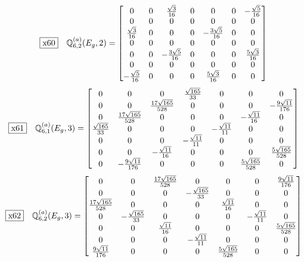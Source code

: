 \documentclass[fleqn,10pt,landscape]{jsarticle}
\begin{document}
\begin{dmath*}
\fbox{x60}\quad \mathbb{Q}_{6,2}^{(a)}(E_{g},2)=\begin{bmatrix} 0 & 0 & \frac{\sqrt{3}}{16} & 0 & 0 & 0 & - \frac{\sqrt{5}}{16} \\ 0 & 0 & 0 & 0 & 0 & 0 & 0 \\ \frac{\sqrt{3}}{16} & 0 & 0 & 0 & - \frac{3 \sqrt{5}}{16} & 0 & 0 \\ 0 & 0 & 0 & 0 & 0 & 0 & 0 \\ 0 & 0 & - \frac{3 \sqrt{5}}{16} & 0 & 0 & 0 & \frac{5 \sqrt{3}}{16} \\ 0 & 0 & 0 & 0 & 0 & 0 & 0 \\ - \frac{\sqrt{5}}{16} & 0 & 0 & 0 & \frac{5 \sqrt{3}}{16} & 0 & 0 \end{bmatrix}
\end{dmath*}
\begin{dmath*}
\fbox{x61}\quad \mathbb{Q}_{6,1}^{(a)}(E_{g},3)=\begin{bmatrix} 0 & 0 & 0 & \frac{\sqrt{165}}{33} & 0 & 0 & 0 \\ 0 & 0 & \frac{17 \sqrt{165}}{528} & 0 & 0 & 0 & - \frac{9 \sqrt{11}}{176} \\ 0 & \frac{17 \sqrt{165}}{528} & 0 & 0 & 0 & - \frac{\sqrt{11}}{16} & 0 \\ \frac{\sqrt{165}}{33} & 0 & 0 & 0 & - \frac{\sqrt{11}}{11} & 0 & 0 \\ 0 & 0 & 0 & - \frac{\sqrt{11}}{11} & 0 & 0 & 0 \\ 0 & 0 & - \frac{\sqrt{11}}{16} & 0 & 0 & 0 & \frac{5 \sqrt{165}}{528} \\ 0 & - \frac{9 \sqrt{11}}{176} & 0 & 0 & 0 & \frac{5 \sqrt{165}}{528} & 0 \end{bmatrix}
\end{dmath*}
\begin{dmath*}
\fbox{x62}\quad \mathbb{Q}_{6,2}^{(a)}(E_{g},3)=\begin{bmatrix} 0 & 0 & \frac{17 \sqrt{165}}{528} & 0 & 0 & 0 & \frac{9 \sqrt{11}}{176} \\ 0 & 0 & 0 & - \frac{\sqrt{165}}{33} & 0 & 0 & 0 \\ \frac{17 \sqrt{165}}{528} & 0 & 0 & 0 & \frac{\sqrt{11}}{16} & 0 & 0 \\ 0 & - \frac{\sqrt{165}}{33} & 0 & 0 & 0 & - \frac{\sqrt{11}}{11} & 0 \\ 0 & 0 & \frac{\sqrt{11}}{16} & 0 & 0 & 0 & \frac{5 \sqrt{165}}{528} \\ 0 & 0 & 0 & - \frac{\sqrt{11}}{11} & 0 & 0 & 0 \\ \frac{9 \sqrt{11}}{176} & 0 & 0 & 0 & \frac{5 \sqrt{165}}{528} & 0 & 0 \end{bmatrix}
\end{dmath*}
\end{document}
